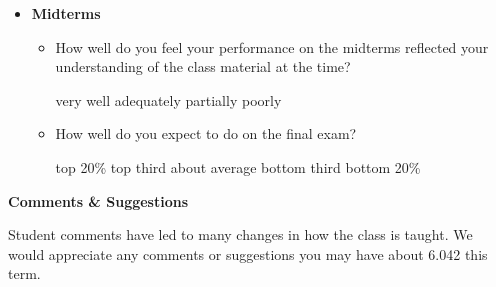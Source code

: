 \documentclass[handout]{mcs}
\begin{document}
\begin{itemize}
\item \textbf{Midterms}

\begin{itemize}

\item How well do you feel your performance on the midterms
  reflected your understanding of the class material at the time?

\begin{center}
very well\hspace{0.3in} adequately\hspace{0.3in} partially\hspace{0.3in} poorly
\end{center}

\item How well do you expect to do on the final exam?

\begin{center}
top 20\%\hspace{0.3in} top third \hspace{0.3in} about average\hspace{0.3in}  bottom third \hspace{0.3in} 
 bottom 20\%
\end{center}

\end{itemize}

\iffalse

\item \textbf{Summary}

\begin{itemize}
\item How well do you think you have understood the material?

\begin{center}
very well\hspace{0.3in} adequately\hspace{0.3in} partially\hspace{0.3in} poorly
\end{center}

\item What should we do to improve this?

\begin{center}
more problem videos\hspace{0.3in} less material covered\hspace{0.3in} graded psets\hspace{0.3in} other:\brule{0.5in}
\end{center}
\fi


\end{itemize}

\newpage

\begin{center}
\large  \textbf{Comments \& Suggestions}
\end{center}

Student comments have led to many changes in how the class is taught.
We would appreciate any comments or suggestions you may have about
6.042 this term.
\end{document}
